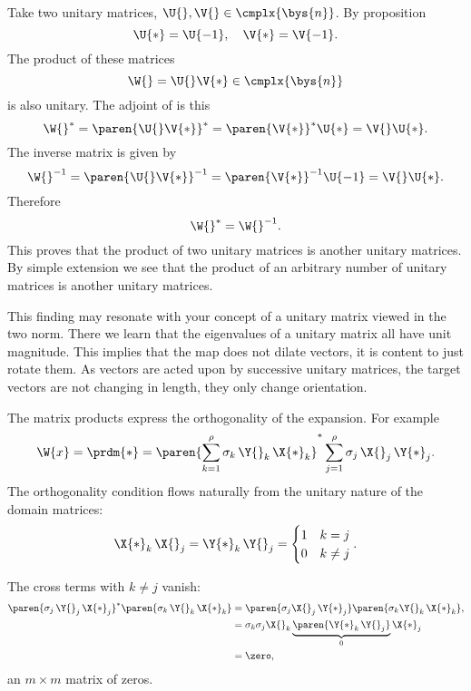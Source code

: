 Take two unitary matrices, $\U{}, \V{} \in \cmplx{\bys{n}}$. By proposition
\begin{equation}
  \U{*} = \U{-1}, \quad \V{*} = \V{-1}.
\end{equation}
The product of these matrices
\begin{equation}
  \W{}=\U{}\V{*} \in \cmplx{\bys{n}}
\end{equation}
is also unitary.
The adjoint of is this
\begin{equation}
  \W{}^{*} = \paren{\U{}\V{*}}^{*} = \paren{\V{*}}^{*}\U{*} = \V{}\U{*}.
\end{equation}
 The inverse matrix is given by
\begin{equation}
  \W{}^{-1}=\paren{\U{}\V{*}}^{-1} = \paren{\V{*}}^{-1}\U{-1} = \V{}\U{*}.
\end{equation}
Therefore
\begin{equation}
  \W{}^{*} = \W{}^{-1}.
\end{equation}
This proves that the product of two unitary matrices is another unitary matrices. By simple extension we see that the product of an arbitrary number of unitary matrices is another unitary matrices.

This finding may resonate with your concept of a unitary matrix viewed in the two norm. There we learn that the eigenvalues of a unitary matrix all have unit magnitude. This implies that the map does not dilate vectors, it is content to just rotate them. As vectors are acted upon by successive unitary matrices, the target vectors are not changing in length, they only change orientation.

The matrix products express the orthogonality of the expansion. For example
\begin{equation}
  \begin{split}
    \W{x} = \prdm{*} = \paren{\sum_{k=1}^{\rho}{\sigma_{k}\, \Y{}_{k}\, \X{*}_{k}}}^{*}\sum_{j=1}^{\rho}{\sigma_{j}\, \X{}_{j}\, \Y{*}_{j}}.
  \end{split}
\end{equation}
The orthogonality condition flows naturally from the unitary nature of the domain matrices:
\begin{equation}
  \X{*}_{k}\,\X{}_{j} = \Y{*}_{k}\,\Y{}_{j} =
  \begin{cases}
    1 & k = j\\
    0 & k \ne j
  \end{cases}.
\end{equation}

The cross terms with $k\ne j$ vanish:
\begin{equation}
  \begin{split}
    \paren{\sigma_{j}\, \Y{}_{j}\, \X{*}_{j}}^{*}\paren{\sigma_{k}\, \Y{}_{k}\, \X{*}_{k}} &= \paren{\sigma_{j}\X{}_{j}\, \Y{*}_{j}}\paren{\sigma_{k}\Y{}_{k}\, \X{*}_{k}}, \\
    &= \sigma_{k}\sigma_{j}\X{}_{k}\underbrace{\paren{\Y{*}_{k}\,\Y{}_{j}}}_{0}\X{*}_{j}\\
    & = \zero,
  \end{split}
\end{equation}
an $m\times m$ matrix of zeros.

